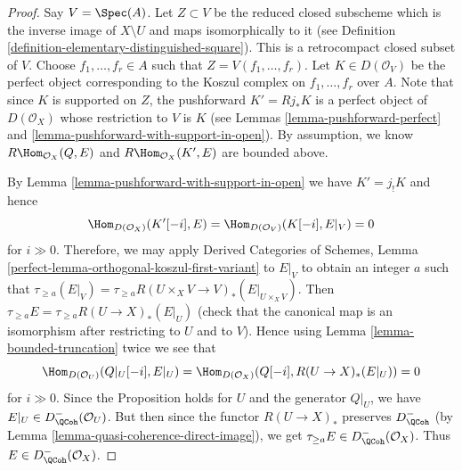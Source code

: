 \begin{proof}
\medskip\noindent
Say $V = \Spec(A)$. Let $Z \subset V$ be the reduced closed subscheme
which is the inverse image of $X \setminus U$ and maps isomorphically to it
(see Definition \ref{definition-elementary-distinguished-square}).
This is a retrocompact closed subset of $V$.
Choose $f_1, \ldots, f_r \in A$ such that
$Z = V(f_1, \ldots, f_r)$. Let $K \in D(\mathcal{O}_V)$ be the perfect
object corresponding to the Koszul complex on $f_1, \ldots, f_r$ over $A$.
Note that since $K$ is supported on $Z$, the pushforward
$K' = Rj_*K$ is a perfect object of $D(\mathcal{O}_X)$ whose
restriction to $V$ is $K$ (see Lemmas \ref{lemma-pushforward-perfect}
and \ref{lemma-pushforward-with-support-in-open}).
By assumption, we know $R\Hom_{\mathcal{O}_X}(Q, E)$ and
$R\Hom_{\mathcal{O}_X}(K', E)$ are bounded above.

\medskip\noindent
By Lemma \ref{lemma-pushforward-with-support-in-open}
we have $K' =  j_!K$ and hence
$$
\Hom_{D(\mathcal{O}_X)}(K'[-i], E) = \Hom_{D(\mathcal{O}_V)}(K[-i], E|_V) = 0
$$
for $i \gg 0$. Therefore, we may apply
Derived Categories of Schemes,
Lemma \ref{perfect-lemma-orthogonal-koszul-first-variant} to $E|_V$ to
obtain an integer $a$ such that
$\tau_{\geq a}(E|_V) =
\tau_{\geq a} R (U \times_X V \to V)_* (E|_{U \times_X V})$.
Then $\tau_{\geq a} E = \tau_{\geq a} R (U \to X)_* (E |_U)$
(check that the canonical map is an isomorphism after restricting to
$U$ and to $V$). Hence using Lemma \ref{lemma-bounded-truncation}
twice we see that
$$
\Hom_{D(\mathcal{O}_U)}(Q|_U [-i], E|_U) =
\Hom_{D(\mathcal{O}_X)}(Q[-i], R (U \to X)_* (E|_U)) = 0
$$
for $i \gg 0$. Since the Proposition holds for $U$ and the generator
$Q|_U$, we have $E|_U \in D^-_\QCoh(\mathcal{O}_U)$. But then since
the functor $R (U \to X)_*$ preserves $D^-_\QCoh$
(by Lemma \ref{lemma-quasi-coherence-direct-image}), we get
$\tau_{\geq a}E \in D^-_\QCoh(\mathcal{O}_X)$. Thus
$E \in D^-_\QCoh (\mathcal{O}_X)$.
\end{proof}

